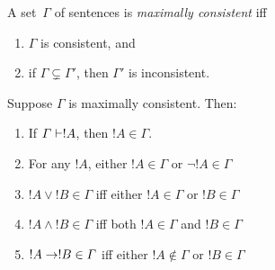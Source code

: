 \documentclass[open-logic-section]{subfiles}
\begin{document}

\begin{defn}
A set~$\Gamma$ of sentences is \emph{maximally consistent} iff
\begin{enumerate}
\item $\Gamma$ is consistent, and
\item if $\Gamma \subsetneq \Gamma'$, then $\Gamma'$ is inconsistent.
\end{enumerate}
\end{defn}

\begin{prop}
Suppose $\Gamma$ is maximally consistent. Then:
\begin{enumerate}
\item If $\Gamma \Proves !A$, then $!A \in \Gamma$.
\item For any $!A$, either $!A \in \Gamma$ or $\lnot !A \in \Gamma$
\item $!A \lor !B \in \Gamma$ iff either $!A \in \Gamma$ or $!B \in \Gamma$
\item $!A \land !B \in \Gamma$ iff both $!A \in \Gamma$ and $!B \in \Gamma$
\item $!A \to !B \in \Gamma$ iff either $!A \notin \Gamma$ or $!B \in \Gamma$
\end{enumerate}
\end{prop}
\end{document}
